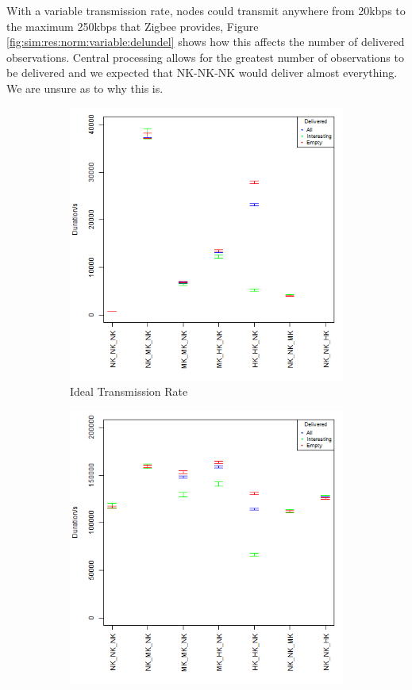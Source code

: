 With a variable transmission rate, nodes could transmit anywhere from 20kbps to the maximum 250kbps that Zigbee provides, Figure \ref{fig:sim:res:norm:variable:delundel} shows how this affects the number of delivered observations. Central processing allows for the greatest number of observations to be delivered and we expected that NK-NK-NK would deliver almost everything. We are unsure as to why this is.

\begin{figure}

\begin{subfigure}{\textwidth}
\centering
  \includegraphics[height=.5\textheight]{Chap7/figures/plots/normal_ideal/delivered_mean.png}
  \caption{Ideal Transmission Rate}
\label{fig:sim:res:norm:ideal:delmean}
\end{subfigure}%
\vfill
\begin{subfigure}{\textwidth}
\centering
  \includegraphics[height=.5\textheight]{Chap7/figures/plots/normal_variable/delivered_mean.png}

\end{subfigure}
\end{figure}
